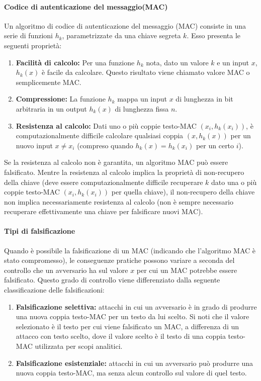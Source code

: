 \documentclass{article}
\theoremstyle{definition}
\begin{document}
\paragraph{Codice di autenticazione del messaggio(MAC)}
Un algoritmo di codice di autenticazione del messaggio (MAC) consiste in una serie di funzioni \(h_k\), parametrizzate da una chiave segreta \(k\). Esso presenta le seguenti proprietà:
\begin{enumerate}
    \item \textbf{Facilità di calcolo:} Per una funzione \(h_k\) nota, dato un valore \(k\) e un input \(x\), \(h_k(x)\) è facile da calcolare. Questo risultato viene chiamato valore MAC o semplicemente MAC.
    \item \textbf{Compressione:} La funzione \(h_k\) mappa un input \(x\) di lunghezza in bit arbitraria in un output \(h_k(x)\) di lunghezza fissa \(n\).
    \item \textbf{Resistenza al calcolo:} Dati uno o più coppie testo-MAC \((x_i, h_k(x_i))\), è computazionalmente difficile calcolare qualsiasi coppia \((x, h_k(x))\) per un nuovo input \(x \neq x_i\) (compreso quando \(h_k(x) = h_k(x_i)\) per un certo \(i\)).
\end{enumerate}
Se la resistenza al calcolo non è garantita, un algoritmo MAC può essere falsificato. Mentre la resistenza al calcolo implica la proprietà di non-recupero della chiave (deve essere computazionalmente difficile recuperare \(k\) dato una o più coppie testo-MAC \((x_i, h_k(x_i))\) per quella chiave), il non-recupero della chiave non implica necessariamente resistenza al calcolo (non è sempre necessario recuperare effettivamente una chiave per falsificare nuovi MAC).

\paragraph{Tipi di falsificazione}
Quando è possibile la falsificazione di un MAC (indicando che l'algoritmo MAC è stato compromesso), le conseguenze pratiche possono variare a seconda del controllo che un avversario ha sul valore \(x\) per cui un MAC potrebbe essere falsificato. Questo grado di controllo viene differenziato dalla seguente classificazione delle falsificazioni:

\begin{enumerate}
    \item \textbf{Falsificazione selettiva:} attacchi in cui un avversario è in grado di produrre una nuova coppia testo-MAC per un testo da lui scelto. Si noti che il valore selezionato è il testo per cui viene falsificato un MAC, a differenza di un attacco con testo scelto, dove il valore scelto è il testo di una coppia testo-MAC utilizzata per scopi analitici.
    \item \textbf{Falsificazione esistenziale:} attacchi in cui un avversario può produrre una nuova coppia testo-MAC, ma senza alcun controllo sul valore di quel testo.
\end{enumerate}
\end{document}
